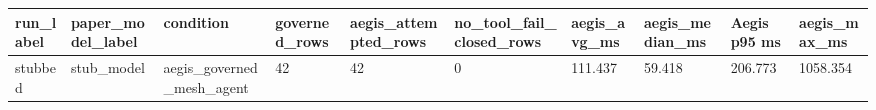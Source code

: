 \begin{tabular}{llllllllll}
 \hline
run\_label & paper\_model\_label & condition & governed\_rows & aegis\_attempted\_rows & no\_tool\_fail\_closed\_rows & aegis\_avg\_ms & aegis\_median\_ms & Aegis p95 ms & aegis\_max\_ms \\
 \hline
stubbed & stub\_model & aegis\_governed\_mesh\_agent & 42 & 42 & 0 & 111.437 & 59.418 & 206.773 & 1058.354 \\
 \hline
\end{tabular}
